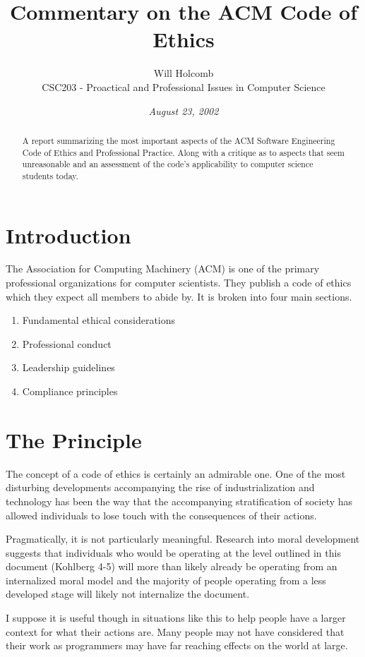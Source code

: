 \documentclass[12pt,a4paper,twoside]{article}  %
\author{Will Holcomb\\
  \small{CSC203 - Proactical and Professional Issues in Computer Science}}
\title{Commentary on the ACM Code of Ethics}
\date{\small\it August 23, 2002}
\begin{document}
\maketitle
\begin{abstract}
A report summarizing the most important aspects of the ACM Software
Engineering Code of Ethics and Professional Practice. \cite{acm} Along
with a critique as to aspects that seem unreasonable and an assessment
of the code's applicability to computer science students today.
\end{abstract}

\section{Introduction}
The Association for Computing Machinery (ACM) is one of the primary
professional organizations for computer scientists. They publish a
code of ethics \cite{acm} which they expect all members to abide
by. It is broken into four main sections.

\begin{enumerate}
\item Fundamental ethical considerations
\item Professional conduct
\item Leadership guidelines
\item Compliance principles
\end{enumerate}

\section{The Principle}
The concept of a code of ethics is certainly an admirable one. One of
the most disturbing developments accompanying the rise of
industrialization and technology has been the way that the
accompanying stratification of society has allowed individuals to lose
touch with the consequences of their actions.

Pragmatically, it is not particularly meaningful. Research into moral
development \cite{kohlberg} suggests that individuals who would be
operating at the level outlined in this document (Kohlberg 4-5) will
more than likely already be operating from an internalized moral model
and the majority of people operating from a less developed stage will
likely not internalize the document.

I suppose it is useful though in situations like this to help people
have a larger context for what their actions are. Many people may not
have considered that their work as programmers may have far reaching
effects on the world at large.
\end{document}
